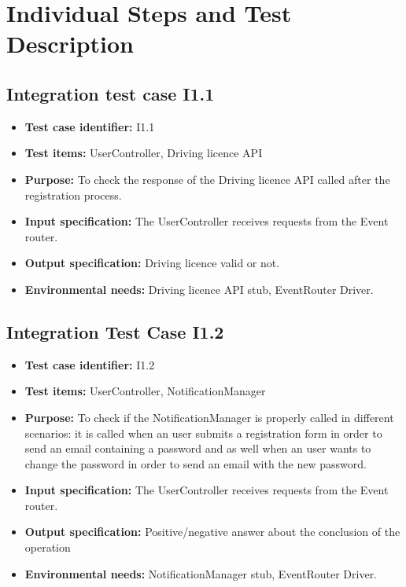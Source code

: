 \chapter{Individual Steps and Test Description}
\section{Integration test case I1.1}

\begin{itemize}
\item \textbf{Test case identifier:} I1.1
\item \textbf{Test items:} UserController, Driving licence API
\item \textbf{Purpose:} To check the response of the Driving licence API called after the registration process.
\item \textbf{Input specification:} The UserController receives requests from the Event router.
\item \textbf{Output specification:} Driving licence valid or not.
\item \textbf{Environmental needs:} Driving licence API stub, EventRouter Driver.
\end{itemize}

\section{Integration Test Case I1.2}
\begin{itemize}
\item \textbf{Test case identifier:}  I1.2
\item \textbf{Test items:} UserController, NotificationManager
\item \textbf{Purpose:} To check if the NotificationManager is properly called in different scenarios: it is called when an user submits a registration form in order to send an email containing a password and as well when an user wants to change the password  in order to send an email with the new password.
\item \textbf{Input specification:} The UserController receives requests from the Event router.
\item \textbf{Output specification:} Positive/negative answer about the conclusion of the operation
\item \textbf{Environmental needs:} NotificationManager stub,  EventRouter Driver.
\end{itemize}

